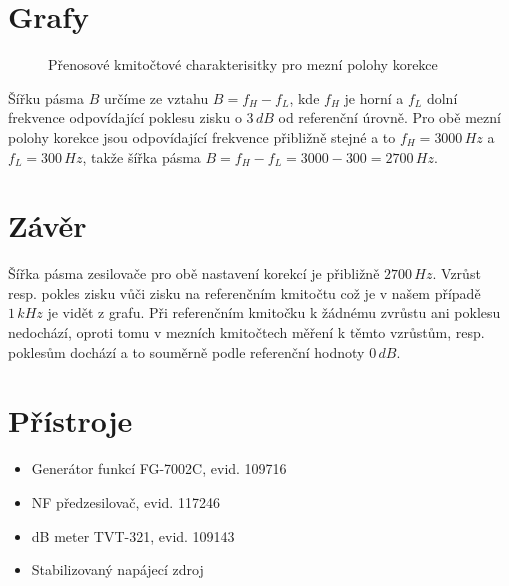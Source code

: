 \documentclass[12pt]{article} %
\begin{document}
\section{Grafy}
\begin{figure}[H]
\centering
	\caption{Přenosové kmitočtové charakterisitky pro mezní polohy korekce}
\end{figure}

Šířku pásma $B$ určíme ze vztahu $B = f_H - f_L$, kde $f_H$ je horní a $f_L$ dolní frekvence odpovídající poklesu zisku o $3\,dB$ od referenční úrovně. Pro obě mezní polohy korekce jsou odpovídající frekvence přibližně stejné a to $f_H = 3000\,Hz$ a $f_L = 300\,Hz$, takže šířka pásma $B = f_H - f_L = 3000 - 300 = 2700\,Hz$.

\section{Závěr}
Šířka pásma zesilovače pro obě nastavení korekcí je přibližně $2700\,Hz$. Vzrůst resp. pokles zisku vůči zisku na referenčním kmitočtu což je v našem případě $1\,kHz$ je vidět z grafu. Při referenčním kmitočku k žádnému zvrůstu ani poklesu nedochází, oproti tomu v mezních kmitočtech měření k těmto vzrůstům, resp. poklesům dochází a to souměrně podle referenční hodnoty $0\,dB$.

\section{Přístroje}
\begin{itemize}
\item Generátor funkcí FG-7002C, evid. 109716
\item NF předzesilovač, evid. 117246
\item dB meter TVT-321, evid. 109143
\item Stabilizovaný napájecí zdroj
\end{itemize}
\end{document}
